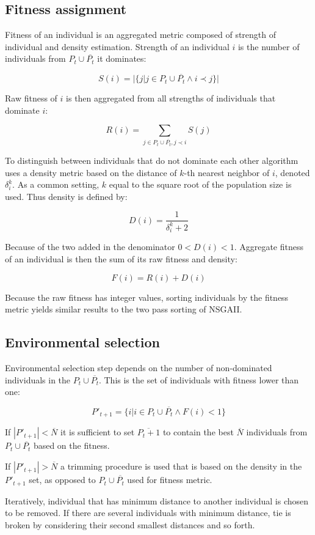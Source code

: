 \documentclass[12pt,oneside]{fithesis2}
\begin{document}
\subsection{Fitness assignment}
	Fitness of an individual is an aggregated metric composed of strength of individual and density estimation. Strength of an individual $i$ is the number of individuals from $P_t \cup \overline{P_t}$ it dominates:

$$ S(i) = |\{j| j \in P_t \cup \overline{P_t} \land i \prec j\}| $$

Raw fitness of $i$ is then aggregated from all strengths of individuals that dominate $i$:

$$ R(i) = \sum\limits_{j \in P_t \cup \overline{P_t},j \prec i} S(j)$$

To distinguish between individuals that do not dominate each other algorithm uses a density metric based on the distance of $k$-th nearest neighbor of $i$, denoted $\delta^k_i$. As a common setting, $k$ equal to the square root of the population size is used. Thus density is defined by:

$$D(i) = \frac{1}{\delta^k_i + 2} $$

Because of the two added in the denominator  $0 < D(i) < 1$. Aggregate fitness of an individual is then the sum of its raw fitness and density:

$$F(i) = R(i) + D(i) $$

Because the raw fitness has integer values, sorting individuals by the fitness metric yields similar results to the two pass sorting of NSGAII.

\subsection{Environmental selection}
Environmental selection step depends on the number of non-dominated individuals in the $P_t \cup \overline{P_t}$. This is the set of individuals with fitness lower than one:

$$P'_{t+1} =\{i | i \in P_t \cup \overline{P_t} \land F(i)<1\}$$

If $|P'_{t+1}| < \overline N$ it is sufficient to set $\overline{P_t+1}$ to contain the best $\overline N$ individuals from $P_t \cup \overline{P_t}$ based on the fitness.

If $|P'_{t+1}| > \overline N$ a trimming procedure is used that is based on the density in the $P'_{t+1}$ set, as opposed to $P_t \cup \overline{P_t}$ used for fitness metric.

Iteratively, individual that has minimum distance to another individual is chosen to be removed. If there are several individuals with minimum distance, tie is broken by considering their second smallest distances and so forth. 
\end{document}
